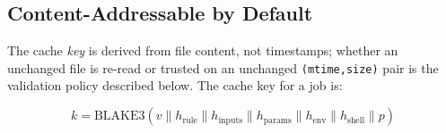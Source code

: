 \documentclass[12pt,a4paper]{article}
\newcommand{\code}[1]{{\texttt{\small\color{inlinecode}#1}}}
\begin{document}
\subsection{Content-Addressable by Default}
\label{sec:content-addressable}

The cache \emph{key} is derived from file content, not timestamps;
whether an unchanged file is re-read or trusted on an unchanged
\code{(mtime,size)} pair is the validation policy described below. The
cache key for a job is:

\begin{equation}
\label{eq:cache-key}
k = \text{BLAKE3}\!\left(
  v \mathbin\| h_{\text{rule}} \mathbin\| h_{\text{inputs}}
  \mathbin\| h_{\text{params}} \mathbin\| h_{\text{env}}
  \mathbin\| h_{\text{shell}} \mathbin\| p
\right)
\end{equation}
\end{document}

